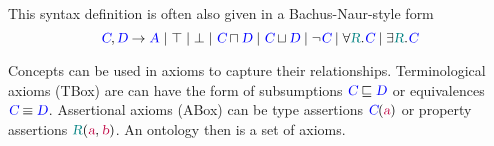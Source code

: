 This syntax definition  is often also given in a Bachus-Naur-style form
 \index{$\top$}\index{$\bot$}\index{$\DLand$}\index{$\DLor$}
\begin{equation}
        \DLConVar C, \DLConVar D \rightarrow \DLConVar A \mid \top \mid \bot \mid \DLConVar C \DLand \DLConVar D \mid \DLConVar C \DLor \DLConVar D \mid \neg \DLConVar C \mid \forall \DLRolVar R.\DLConVar C \mid \exists \DLRolVar R.\DLConVar C
\end{equation}

Concepts can be used in axioms to capture their relationships. Terminological axioms (TBox) are can have the form of subsumptions ${\textcolor{blue}{\textsl{C}}}\sqsubseteq{\ensuremath{\textcolor{blue}{\textsl{D}}}}$ or equivalences ${\textcolor{blue}{\textsl{C}}}\equiv{\ensuremath{\textcolor{blue}{\textsl{D}}}}$. Assertional axioms (ABox) can be type assertions ${\textcolor{blue}{\textsl{C}}}({\textcolor{purple}{\textsl{a}}})$ or property assertions $\varR(\DLIndVar a, \DLIndVar b)$. An ontology then is a set of axioms.

